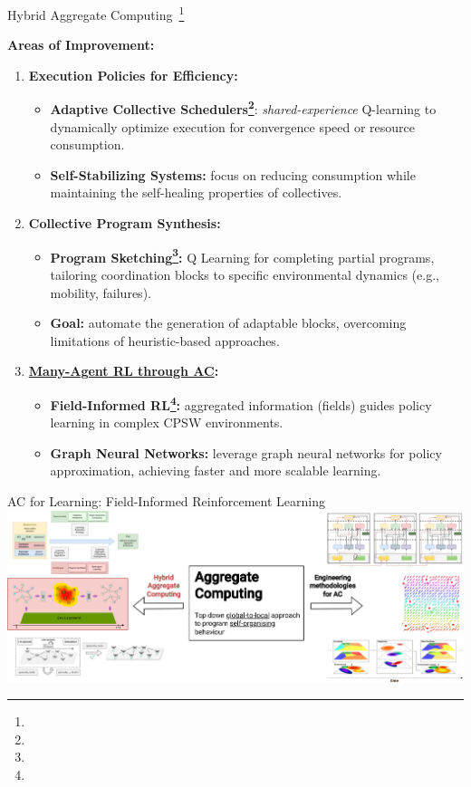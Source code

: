 \documentclass[presentation, 8pt,169]{beamer}\mode<presentation>{\usetheme{AMSBolognaFC}}
\begin{document}
\begin{frame}{Hybrid Aggregate Computing~\footnote[frame]{}}

  \textbf{Areas of Improvement:}
  
  \begin{enumerate}
  \item \textbf{Execution Policies for Efficiency:}
      \begin{itemize}
      \item \textbf{Adaptive Collective Schedulers\footnote{}}: \emph{shared-experience} Q-learning to dynamically optimize execution for convergence speed or resource consumption.
      \item \textbf{Self-Stabilizing Systems:} focus on reducing consumption while maintaining the self-healing properties of collectives.
      \end{itemize}
  \item \textbf{Collective Program Synthesis:}
      \begin{itemize}
      \item \textbf{Program Sketching\footnote{}:} Q Learning for completing partial programs, tailoring coordination blocks to specific environmental dynamics (e.g., mobility, failures).
      \item \textbf{Goal:} automate the generation of adaptable blocks, overcoming limitations of heuristic-based approaches.
      \end{itemize}
  \item \textbf{\underline{Many-Agent RL through AC}:}
      \begin{itemize}
      \item \textbf{Field-Informed RL\footnote{}:} aggregated information (fields) guides policy learning in complex CPSW environments.
      \item \textbf{Graph Neural Networks:} leverage graph neural networks for policy approximation, achieving faster and more scalable learning.
      \end{itemize}
  \end{enumerate}
  
\end{frame}
\begin{frame}{AC for Learning: Field-Informed Reinforcement Learning}
\includegraphics[width=\textwidth]{img/contribution-focus.drawio.png}
\end{frame}
\end{document}
